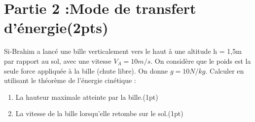 \documentclass[12pt]{article}
\begin{document}
\section*{Partie 2 :Mode de transfert d’énergie\dotfill (2pts)}

Si-Brahim a lancé une bille verticalement vers le haut à une altitude
h = 1,5m par rapport au sol, avec une vitesse $V_A= 10 m/s$.
On considère que le poids est la seule force appliquée à la
bille (chute libre).
On donne $g = 10 N/kg$.
Calculer en utilisant le théorème de l’énergie cinétique :

\begin{enumerate}
  \item La hauteur maximale atteinte par la bille.\dotfill(1pt)

  \item  La vitesse de la bille lorsqu’elle retombe sur le sol.\dotfill(1pt)

\end{enumerate}
\end{document}

